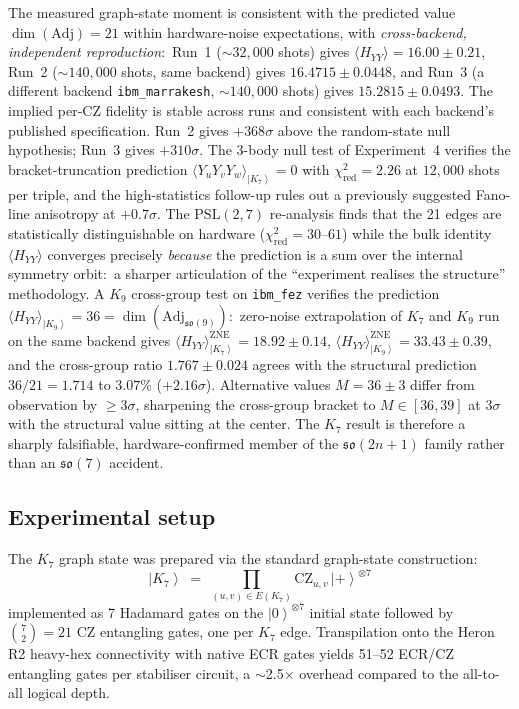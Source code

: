 \documentclass[11pt]{article}
\newcommand{\so}{\mathfrak{so}}
\newcommand{\Adj}{\mathrm{Adj}}
\newcommand{\ket}[1]{\left|#1\right\rangle}
\begin{document}
The measured graph-state moment is consistent with the predicted
value $\dim(\Adj) = 21$ within hardware-noise expectations, with
\emph{cross-backend, independent reproduction}:\ Run~1
($\sim 32{,}000$ shots) gives $\langle H_{YY}\rangle = 16.00 \pm 0.21$,
Run~2 ($\sim 140{,}000$ shots, same backend) gives
$16.4715 \pm 0.0448$, and Run~3 (a different backend
\texttt{ibm\_marrakesh}, $\sim 140{,}000$ shots) gives
$15.2815 \pm 0.0493$.  The implied per-CZ fidelity is stable across
runs and consistent with each backend's published specification.
Run~2 gives $+368\sigma$ above the random-state null hypothesis;
Run~3 gives $+310\sigma$.  The 3-body null test of Experiment~4
verifies the bracket-truncation prediction
$\langle Y_uY_vY_w\rangle_{\ket{K_7}} = 0$ with
$\chi^2_{\text{red}} = 2.26$ at $12{,}000$ shots per triple, and
the high-statistics follow-up rules out a previously suggested
Fano-line anisotropy at $+0.7\sigma$.  The
$\mathrm{PSL}(2,7)$ re-analysis finds that the 21 edges are
statistically distinguishable on hardware
($\chi^2_{\text{red}} = 30$--$61$) while the bulk identity
$\langle H_{YY}\rangle$ converges precisely \emph{because} the
prediction is a sum over the internal symmetry orbit:\ a
sharper articulation of the ``experiment realises the structure''
methodology.  A $K_9$ cross-group test on \texttt{ibm\_fez} verifies the prediction
$\langle H_{YY}\rangle_{\ket{K_9}} = 36 = \dim(\Adj_{\so(9)})$:\
zero-noise extrapolation of $K_7$ and $K_9$ run on the same backend
gives $\langle H_{YY}\rangle^{\text{ZNE}}_{\ket{K_7}} = 18.92 \pm 0.14$,
$\langle H_{YY}\rangle^{\text{ZNE}}_{\ket{K_9}} = 33.43 \pm 0.39$, and
the cross-group ratio $1.767 \pm 0.024$ agrees with the structural
prediction $36/21 = 1.714$ to $3.07\%$ ($+2.16\sigma$).  Alternative
values $M = 36 \pm 3$ differ from observation by $\geq 3\sigma$,
sharpening the cross-group bracket to $M \in [36, 39]$ at $3\sigma$
with the structural value sitting at the center.  The $K_7$ result
is therefore a sharply falsifiable, hardware-confirmed member of
the $\so(2n+1)$ family rather than an $\so(7)$ accident.

\subsection{Experimental setup}
\label{sec:heron-setup}

The $K_7$ graph state was prepared via the standard graph-state
construction:
\begin{equation}
  \ket{K_7}
  \;=\;
  \prod_{(u,v)\in E(K_7)}\!\!\!\!\!\! \mathrm{CZ}_{u,v}\,
  \ket{+}^{\otimes 7}
\end{equation}
implemented as 7 Hadamard gates on the $\ket{0}^{\otimes 7}$ initial
state followed by $\binom{7}{2} = 21$ $\mathrm{CZ}$ entangling gates,
one per $K_7$ edge.  Transpilation onto the Heron R2 heavy-hex
connectivity with native ECR gates yields
51--52 ECR/CZ entangling gates per stabiliser circuit, a $\sim$2.5$\times$
overhead compared to the all-to-all logical depth.
\end{document}
